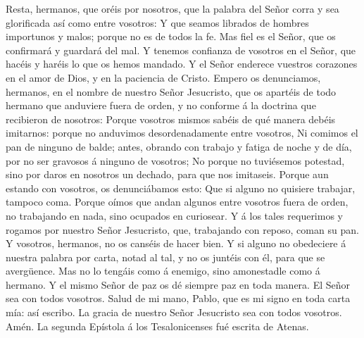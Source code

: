  Resta, hermanos, que oréis por nosotros, que la palabra
del Señor corra y sea glorificada así como entre vosotros:
 Y que seamos librados de hombres importunos y malos;
porque no es de todos la fe.  Mas fiel es el Señor, que os
confirmará y guardará del mal.  Y tenemos confianza de
vosotros en el Señor, que hacéis y haréis lo que os hemos mandado.
 Y el Señor enderece vuestros corazones en el amor de
Dios, y en la paciencia de Cristo.  Empero os denunciamos,
hermanos, en el nombre de nuestro Señor Jesucristo, que os apartéis de
todo hermano que anduviere fuera de orden, y no conforme á la doctrina
que recibieron de nosotros:  Porque vosotros mismos sabéis
de qué manera debéis imitarnos: porque no anduvimos desordenadamente
entre vosotros,  Ni comimos el pan de ninguno de balde;
antes, obrando con trabajo y fatiga de noche y de día, por no ser
gravosos á ninguno de vosotros;  No porque no tuviésemos
potestad, sino por daros en nosotros un dechado, para que nos imitaseis.
 Porque aun estando con vosotros, os denunciábamos esto:
Que si alguno no quisiere trabajar, tampoco coma.  Porque
oímos que andan algunos entre vosotros fuera de orden, no trabajando en
nada, sino ocupados en curiosear.  Y á los tales
requerimos y rogamos por nuestro Señor Jesucristo, que, trabajando con
reposo, coman su pan.  Y vosotros, hermanos, no os
canséis de hacer bien.  Y si alguno no obedeciere á
nuestra palabra por carta, notad al tal, y no os juntéis con él, para
que se avergüence.  Mas no lo tengáis como á enemigo,
sino amonestadle como á hermano.  Y el mismo Señor de paz
os dé siempre paz en toda manera. El Señor sea con todos vosotros.
 Salud de mi mano, Pablo, que es mi signo en toda carta
mía: así escribo.  La gracia de nuestro Señor Jesucristo
sea con todos vosotros. Amén. La segunda Epístola á los Tesalonicenses
fué escrita de Atenas.
